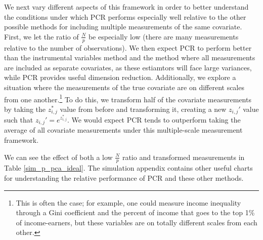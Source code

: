 \documentclass[10pt]{article}
\begin{document}
        We next vary different aspects of this framework in order to better understand the conditions under which PCR performs especially well relative to the other possible methods for including multiple measurements of the same covariate. First, we let the ratio of $\frac{N}{p}$ be especially low (there are many measurements relative to the number of observations). We then expect PCR to perform better than the instrumental variables method and the method where all measurements are included as separate covariates, as these estiamtors will face large variances, while PCR provides useful dimension reduction. Additionally, we explore a situation where the measurements of the true covariate are on different scales from one another.\footnote{This is often the case; for example, one could measure income inequality through a Gini coefficient and the percent of income that goes to the top 1\% of income-earners, but these variables are on totally different scales from each other.} To do this, we transform half of the covariate measurements by taking the $z_{i,j}^*$ value from before and transforming it, creating a new $z_{i,j}'$ value such that $z_{i,j}' = e^{z_{i,j}^*}$. We would expect PCR tends to outperform taking the average of all covariate measurements under this multiple-scale measurement framework. 
        
        We can see the effect of both a low $\frac{N}{p}$ ratio and transformed measurements in Table \ref{sim_p_pca_ideal}. The simulation appendix contains other useful charts for understanding the relative performance of PCR and these other methods.

        \begin{table}[!htbp] \centering
            \caption{Average Coefficients for Values of $p$ ($N=100$, Exponential Transformation) \label{sim_p_pca_ideal}}
        \end{table}
\end{document}
